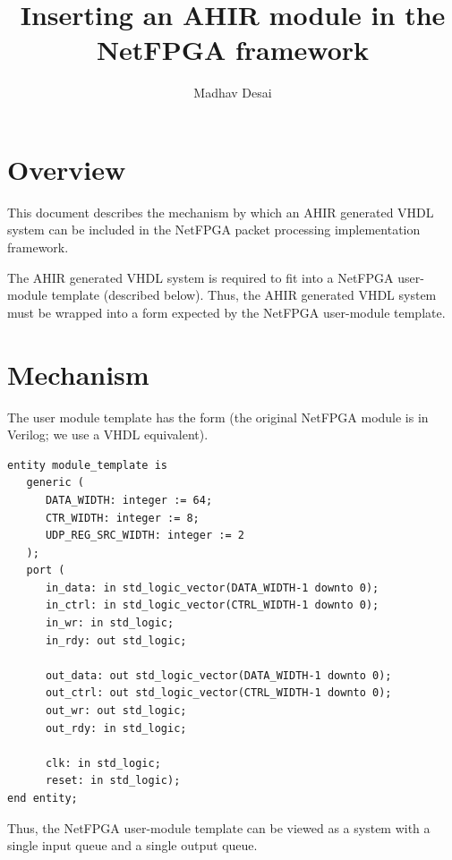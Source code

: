 \documentclass{article}
\title{Inserting an AHIR module in the NetFPGA framework}
\author{Madhav Desai}
\begin{document}
\maketitle

\section{Overview}

This document describes the mechanism by which an 
AHIR generated VHDL system can be included in the NetFPGA packet
processing implementation framework.  

The AHIR generated VHDL system is required to fit into 
a NetFPGA user-module template (described below).  Thus,
the AHIR generated VHDL system must be wrapped into
a form expected by the NetFPGA user-module template.

\section{Mechanism}

The user module template has the form (the original
NetFPGA module is in Verilog; we use a VHDL equivalent).
\begin{verbatim}
entity module_template is
   generic (
      DATA_WIDTH: integer := 64;
      CTR_WIDTH: integer := 8;
      UDP_REG_SRC_WIDTH: integer := 2
   );
   port (
      in_data: in std_logic_vector(DATA_WIDTH-1 downto 0);
      in_ctrl: in std_logic_vector(CTRL_WIDTH-1 downto 0);
      in_wr: in std_logic;
      in_rdy: out std_logic;

      out_data: out std_logic_vector(DATA_WIDTH-1 downto 0);
      out_ctrl: out std_logic_vector(CTRL_WIDTH-1 downto 0);
      out_wr: out std_logic;
      out_rdy: in std_logic;

      clk: in std_logic;
      reset: in std_logic);
end entity;
\end{verbatim}
Thus, the NetFPGA user-module template can be viewed
as a system with a single input queue and a single output queue.
\end{document}

